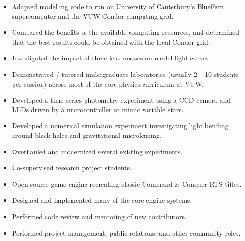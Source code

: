 \documentclass[print]{cv-style}
\begin{document}
\begin{entrylist}
  {
\begin{itemize}
    \item Adapted modelling code to run on University of Canterbury’s BlueFern supercomputer and the VUW Condor computing grid.
    \item Compared the benefits of the available computing resources, and determined that the best results could be obtained with the local Condor grid.
    \item Investigated the impact of three lens masses on model light curves.
  \end{itemize}}
  {
  \begin{itemize}
    \item Demonstrated / tutored undergraduate laboratories (usually 2 -- 10 students per session) across most of the core physics curriculum at VUW.
    \item Developed a time-series photometry experiment using a CCD camera and LEDs driven by a microcontroller to mimic variable stars.
    \item Developed a numerical simulation experiment investigating light bending around black holes and gravitational microlensing.
    \item Overhauled and modernized several existing experiments.
    \item Co-supervised research project students.
    \end{itemize}}
  {
\begin{itemize}
    \item Open source game engine recreating classic Command \& Conquer RTS titles.
    \item Designed and implemented many of the core engine systems.
    \item Performed code review and mentoring of new contributors.
	\item Performed project management, public relations, and other community roles.
  \end{itemize}}

\end{entrylist}
\end{document}
